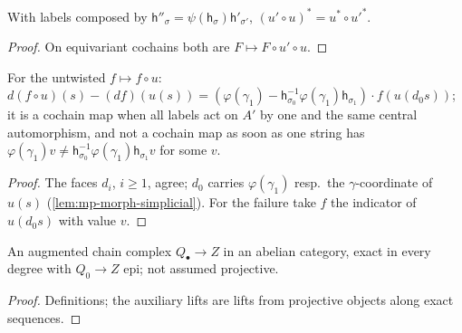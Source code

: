 \begin{lemma}[Composition]\label{lem:mp-pull-comp}
  \leanok
  With labels composed by $\mathsf h''_\sigma=\psi(\mathsf h_\sigma)\mathsf h'_{\sigma'}$, $(u'\circ u)^*=u^*\circ u'^*$.
\end{lemma}
\begin{proof}
  \leanok
  On equivariant cochains both are $F\mapsto F\circ u'\circ u$.
\end{proof}

\begin{theorem}\label{thm:mp-untwisted}
  \leanok
  For the untwisted $f\mapsto f\circ u$:
  $d(f\circ u)(s)-(df)(u(s))=(\varphi(\gamma_1)-\mathsf h_{\sigma_0}^{-1}\varphi(\gamma_1)\mathsf h_{\sigma_1})\cdot f(u(d_0s))$; it is a cochain map
  when all labels act on $A'$ by one and the same central automorphism, and not a cochain map as soon as one string has
  $\varphi(\gamma_1)v\neq\mathsf h_{\sigma_0}^{-1}\varphi(\gamma_1)\mathsf h_{\sigma_1}v$ for some $v$.
\end{theorem}
\begin{proof}
  \leanok
  The faces $d_i$, $i\ge1$, agree; $d_0$ carries $\varphi(\gamma_1)$ resp.\ the $\gamma$-coordinate of $u(s)$ (\ref{lem:mp-morph-simplicial}).
  For the failure take $f$ the indicator of $u(d_0s)$ with value $v$.
\end{proof}

\begin{definition}\label{def:mp-exactaug}
  \leanok
  An augmented chain complex $Q_\bullet\to Z$ in an abelian category, exact in every degree with $Q_0\to Z$ epi; not assumed
  projective.
\end{definition}
\begin{proof}
  \leanok
  Definitions; the auxiliary lifts are lifts from projective objects along exact sequences.
\end{proof}

